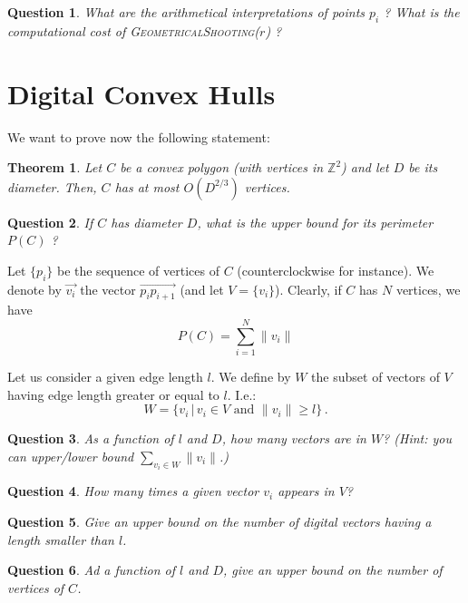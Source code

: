 \documentclass[a4paper, 11pt]{article}
\newtheorem{theorem}{Theorem}
\newtheorem{qu}{Question}
\begin{document}
\begin{qu}
  What are the arithmetical interpretations of points $p_i$ ?
  What is the computational cost of \textsc{GeometricalShooting}($r$) ?
\end{qu}




\section{Digital Convex Hulls}
\noindent We want to prove now the following statement:

\begin{theorem}
  Let $C$ be a convex polygon (with vertices in $\mathbb{Z}^2$) and let $D$ be
  its diameter. Then, $C$ has at most $O(D^{2/3})$ vertices.
\end{theorem}

\begin{qu}
  If $C$ has diameter $D$, what is the upper bound for its perimeter
  $P(C)$ ?
\end{qu}

Let $\{p_i\}$ be the sequence of vertices of $C$ (counterclockwise for
instance). We denote by $\vec{v_i}$ the vector
$\vec{p_ip_{i+1}}$ (and let $V=\{v_i\}$). Clearly, if $C$ has $N$ vertices, we have
\begin{displaymath}
  P(C)=\sum_{i=1}^N \|v_i\|
\end{displaymath}

Let us consider a given edge length $l$. We define by $W$ the subset of
vectors of $V$ having edge length greater or equal to $l$. I.e.:
\begin{displaymath}
  W =\{v_i\,|\, v_i\in V\text{ and }\|v_i\|\geq l\}\,.
\end{displaymath}

\begin{qu}
  As a function of $l$ and $D$, how many vectors are in $W$? (Hint:
  you can
  upper/lower bound $\sum_{v_i\in W} \|v_i\|$.)
\end{qu}


\begin{qu}
  How many times a given vector $v_i$ appears in $V$?
\end{qu}

\begin{qu}
  Give an upper bound on the number of digital vectors having a length
  smaller than $l$.
\end{qu}

\begin{qu}
  Ad a function of $l$ and $D$, give an upper bound on the number of
  vertices of $C$.
\end{qu}
\end{document}
